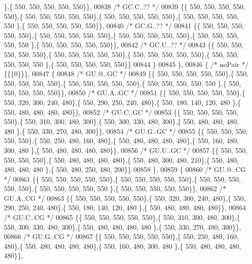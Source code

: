 \begin{DoxyCode}
      \},\{ 550, 550, 550, 550, 550\}\},
00838 \textcolor{comment}{/* GC.C..?? */}
00839 \{\{ 550, 550, 550, 550, 550\},\{ 550, 550, 550, 550, 550\},\{ 550, 550, 550, 550, 550\},\{ 550, 550, 550, 550, 550
      \},\{ 550, 550, 550, 550, 550\}\},
00840 \textcolor{comment}{/* GC.G..?? */}
00841 \{\{ 550, 550, 550, 550, 550\},\{ 550, 550, 550, 550, 550\},\{ 550, 550, 550, 550, 550\},\{ 550, 550, 550, 550, 550
      \},\{ 550, 550, 550, 550, 550\}\},
00842 \textcolor{comment}{/* GC.U..?? */}
00843 \{\{ 550, 550, 550, 550, 550\},\{ 550, 550, 550, 550, 550\},\{ 550, 550, 550, 550, 550\},\{ 550, 550, 550, 550, 550
      \},\{ 550, 550, 550, 550, 550\}\}
00844 \}
00845 \},
00846 \{ \textcolor{comment}{/* noPair */} \{\{\{0\}\}\},
00847 \{
00848 \textcolor{comment}{/* GU.@..GC */}
00849 \{\{ 550, 550, 550, 550, 550\},\{ 550, 550, 550, 550, 550\},\{ 550, 550, 550, 550, 550\},\{ 550, 550, 550, 550, 550
      \},\{ 550, 550, 550, 550, 550\}\},
00850 \textcolor{comment}{/* GU.A..GC */}
00851 \{\{ 550, 550, 550, 550, 550\},\{ 550, 320, 300, 240, 480\},\{ 550, 290, 250, 240, 480\},\{ 550, 180, 140, 120, 480
      \},\{ 550, 480, 480, 480, 480\}\},
00852 \textcolor{comment}{/* GU.C..GC */}
00853 \{\{ 550, 550, 550, 550, 550\},\{ 550, 310, 300, 480, 300\},\{ 550, 300, 330, 480, 300\},\{ 550, 480, 480, 480, 480
      \},\{ 550, 330, 270, 480, 300\}\},
00854 \textcolor{comment}{/* GU.G..GC */}
00855 \{\{ 550, 550, 550, 550, 550\},\{ 550, 250, 480, 160, 480\},\{ 550, 480, 480, 480, 480\},\{ 550, 160, 480, 300, 480
      \},\{ 550, 480, 480, 480, 480\}\},
00856 \textcolor{comment}{/* GU.U..GC */}
00857 \{\{ 550, 550, 550, 550, 550\},\{ 550, 480, 480, 480, 480\},\{ 550, 480, 300, 480, 210\},\{ 550, 480, 480, 480, 480
      \},\{ 550, 480, 250, 480, 200\}\}
00858 \},
00859 \{
00860 \textcolor{comment}{/* GU.@..CG */}
00861 \{\{ 550, 550, 550, 550, 550\},\{ 550, 550, 550, 550, 550\},\{ 550, 550, 550, 550, 550\},\{ 550, 550, 550, 550, 550
      \},\{ 550, 550, 550, 550, 550\}\},
00862 \textcolor{comment}{/* GU.A..CG */}
00863 \{\{ 550, 550, 550, 550, 550\},\{ 550, 320, 300, 240, 480\},\{ 550, 290, 250, 240, 480\},\{ 550, 180, 140, 120, 480
      \},\{ 550, 480, 480, 480, 480\}\},
00864 \textcolor{comment}{/* GU.C..CG */}
00865 \{\{ 550, 550, 550, 550, 550\},\{ 550, 310, 300, 480, 300\},\{ 550, 300, 330, 480, 300\},\{ 550, 480, 480, 480, 480
      \},\{ 550, 330, 270, 480, 300\}\},
00866 \textcolor{comment}{/* GU.G..CG */}
00867 \{\{ 550, 550, 550, 550, 550\},\{ 550, 250, 480, 160, 480\},\{ 550, 480, 480, 480, 480\},\{ 550, 160, 480, 300, 480
      \},\{ 550, 480, 480, 480, 480\}\},

\end{DoxyCode}
